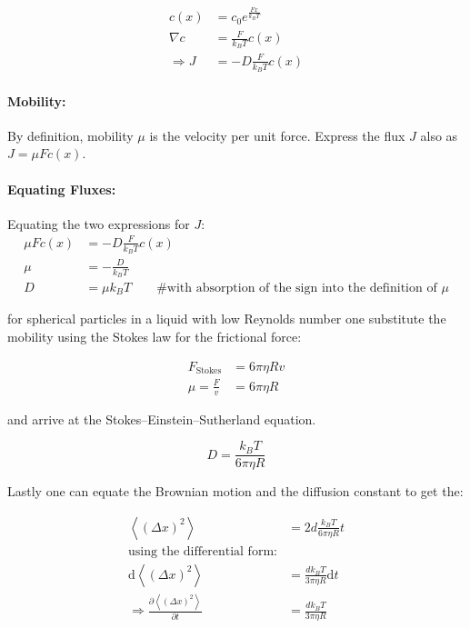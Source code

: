 \documentclass[12pt,english]{scrartcl}
\begin{document}
\begin{align*}
	c(x)          & = c_0 e^{\frac{Fx}{k_BT}} \\
	\nabla c      & = \frac{F}{k_BT} c(x)     \\
	\Rightarrow J & = -D \frac{F}{k_BT} c(x)
\end{align*}

\paragraph{Mobility:} By definition, mobility $\mu$ is the velocity per unit force. Express the flux
$J$ also as $J=\mu Fc(x)$.

\paragraph{Equating Fluxes:} Equating the two expressions for $J$:
\begin{align*}
	\mu Fc(x) & = -D \frac{F}{k_BT} c(x)                                                  \\
	\mu       & = -\frac{D}{k_BT}                                                         \\
	D         & = \mu k_BT\qquad \# \text{with absorption of the sign into the definition
		of } \mu
\end{align*}

for spherical particles in a liquid with low Reynolds number one substitute the
mobility using the Stokes law for the frictional force:

\begin{align*}
	F_\text{Stokes}   & = 6 \pi \eta R v \\
	\mu = \frac{F}{v} & = 6 \pi \eta R
\end{align*}

and arrive at the Stokes–Einstein–Sutherland
equation.\cite{einsteinUberMolekularkinetischenTheorie1905}

\begin{equation}
	D = \frac{k_B T}{6 \pi \eta R}
	\label{eq:sto_ein_sut}
\end{equation}

Lastly one can equate the Brownian motion and the diffusion constant to get
the:

\begin{align}
	\left \langle (\Delta x)^2 \right \rangle                                         & = 2 d \frac{k_B T}{6 \pi \eta R} t                   \\
	\text{using the differential form:}                                               &                                                      \\
	\text{d}\left \langle (\Delta x)^2 \right \rangle                                 & =  \frac{d k_B T}{3 \pi \eta R} \text{d}t            \\
	\Rightarrow \frac{\partial \left \langle (\Delta x)^2 \right \rangle}{\partial t} & =  \frac{d k_B T}{3 \pi \eta R}\label{eq:slope_visc}
\end{align}
\end{document}
